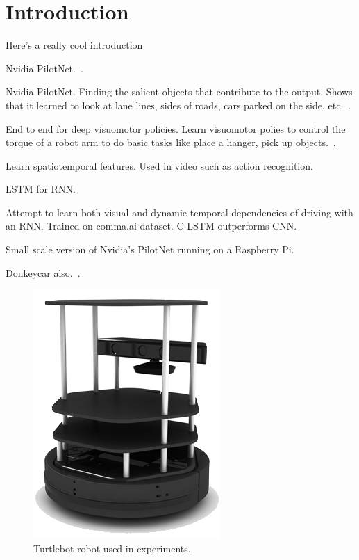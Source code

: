 \section{Introduction}
\label{sec:intro}


Here's a really cool introduction

Nvidia PilotNet.~\cite{bojarski2016end}.

Nvidia PilotNet. Finding the salient objects that contribute to the output.
Shows that it learned to look at lane lines, sides of roads, cars parked on the
side, etc.~\cite{bojarski2017explaining}.

End to end for deep visuomotor policies. Learn visuomotor polies to control the
torque of a robot arm to do basic tasks like place a hanger, pick up objects.~\cite{levine2016end}.

Learn spatiotemporal features. Used in video such as action recognition.~\cite{tran2015learning}

LSTM for RNN.~\cite{xingjian2015convolutional}

Attempt to learn both visual and dynamic temporal dependencies of driving with
an RNN. Trained on comma.ai dataset. C-LSTM outperforms CNN.~\cite{eraqi2017end}

Small scale version of Nvidia's PilotNet running on a Raspberry Pi.~\cite{bechtel2018deeppicar}

Donkeycar also.~\cite{donkeycar}.


\begin{figure}
  \centering
  \includegraphics[scale=1.5]{figures/turtlebot.png}
  \caption{Turtlebot robot used in experiments.}
  \label{f:turtlebot_pic}
\end{figure}
